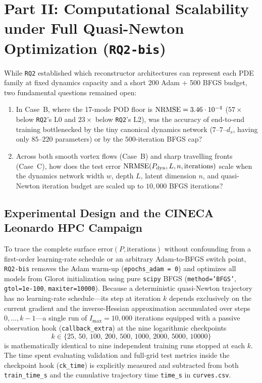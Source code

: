 \section{Part II: Computational Scalability under Full Quasi-Newton Optimization (\texttt{RQ2-bis})}
\label{sec:rq2bis}

While \texttt{RQ2} established which reconstructor architectures can represent each PDE family at fixed dynamics capacity and a short 200 Adam + 500 BFGS budget, two fundamental questions remained open:
\begin{enumerate}[leftmargin=2em]
  \item In Case~B, where the 17-mode POD floor is $\mathrm{NRMSE} = 3.46\cdot 10^{-4}$ ($57\times$ below \texttt{RQ2}'s $\mathrm{L0}$ and $23\times$ below \texttt{RQ2}'s $\mathrm{L2}$), was the accuracy of end-to-end training bottlenecked by the tiny canonical dynamics network ($7\text{--}7\text{--}d_s$, having only $85$--$220$ parameters) or by the $500$-iteration BFGS cap?
  \item Across both smooth vortex flows (Case~B) and sharp travelling fronts (Case~C), how does the test error $\mathrm{NRMSE}(P_{\mathrm{dyn}}, L, n, \text{iterations})$ scale when the dynamics network width $w$, depth $L$, latent dimension $n$, and quasi-Newton iteration budget are scaled up to $10{,}000$ BFGS iterations?
\end{enumerate}

\subsection{Experimental Design and the CINECA Leonardo HPC Campaign}

To trace the complete surface $\mathrm{error}(P, \text{iterations})$ without confounding from a first-order learning-rate schedule or an arbitrary Adam-to-BFGS switch point, \texttt{RQ2-bis} removes the Adam warm-up (\texttt{epochs\_adam = 0}) and optimizes all models from Glorot initialization using pure \texttt{scipy} BFGS (\texttt{method='BFGS'}, \texttt{gtol=1e-100}, \texttt{maxiter=10000}). Because a deterministic quasi-Newton trajectory has no learning-rate schedule---its step at iteration $k$ depends exclusively on the current gradient and the inverse-Hessian approximation accumulated over steps $0,\dots,k-1$---a single run of $I_{\max} = 10{,}000$ iterations equipped with a passive observation hook (\texttt{callback\_extra}) at the nine logarithmic checkpoints
\begin{equation}
  k \in \{25,\, 50,\, 100,\, 200,\, 500,\, 1000,\, 2000,\, 5000,\, 10000\}
  \label{eq:checkpoints}
\end{equation}
is mathematically identical to nine independent training runs stopped at each $k$. The time spent evaluating validation and full-grid test metrics inside the checkpoint hook (\texttt{ck\_time}) is explicitly measured and subtracted from both \texttt{train\_time\_s} and the cumulative trajectory time \texttt{time\_s} in \texttt{curves.csv}.

